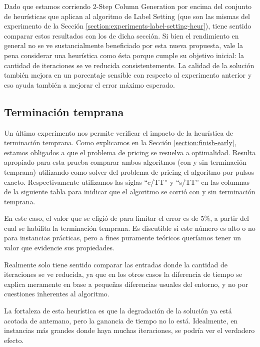 Dado que estamos corriendo 2-Step Column Generation por encima del conjunto de heurísticas que aplican al algoritmo de Label Setting (que son las mismas del experimento de la Sección \ref{section:experiments-label-setting-heur}), tiene sentido comparar estos resultados con los de dicha sección. Si bien el rendimiento en general no se ve sustancialmente beneficiado por esta nueva propuesta, vale la pena considerar una heurística como ésta porque cumple su objetivo inicial: la cantidad de iteraciones se ve reducida consistentemente. La calidad de la solución también mejora en un porcentaje sensible con respecto al experimento anterior y eso ayuda también a mejorar el error máximo esperado.


\subsection{Terminación temprana}

Un último experimento nos permite verificar el impacto de la heurística de terminación temprana. Como explicamos en la Sección \ref{section:finish-early}, estamos obligados a que el problema de pricing se resuelva a optimalidad. Resulta apropiado para esta prueba comparar ambos algoritmos (con y sin terminación temprana) utilizando como solver del problema de pricing el algoritmo por pulsos exacto. Respectivamente utilizamos las siglas ``c/TT'' y ``s/TT'' en las columnas de la siguiente tabla para inidicar que el algoritmo se corrió con y sin terminación temprana. 

En este caso, el valor que se eligió de para limitar el error es de $5\%$, a partir del cual se habilita la terminación temprana. Es discutible si este número es alto o no para instancias prácticas, pero a fines puramente teóricos queríamos tener un valor que evidencie sus propiedades.

Realmente solo tiene sentido comparar las entradas donde la cantidad de iteraciones se ve reducida, ya que en los otros casos la diferencia de tiempo se explica meramente en base a pequeñas diferencias usuales del entorno, y no por cuestiones inherentes al algoritmo. 

La fortaleza de esta heurística es que la degradación de la solución ya está acotada de antemano, pero la ganancia de tiempo no lo está. Idealmente, en instancias más grandes donde haya muchas iteraciones, se podría ver el verdadero efecto.

